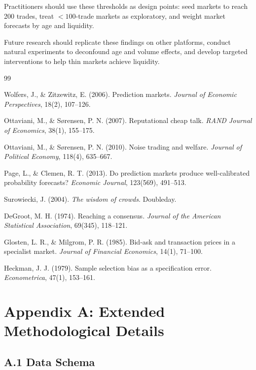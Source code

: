\documentclass[a4paper,11pt]{article}
\theoremstyle{plain}
\theoremstyle{definition}
\begin{document}
Practitioners should use these thresholds as design points: seed markets to reach 200 trades, treat $<100$-trade markets as exploratory, and weight market forecasts by age and liquidity.

Future research should replicate these findings on other platforms, conduct natural experiments to deconfound age and volume effects, and develop targeted interventions to help thin markets achieve liquidity.


\begin{thebibliography}{99}

 Wolfers, J., \& Zitzewitz, E. (2006). Prediction markets. \textit{Journal of Economic Perspectives}, 18(2), 107--126.

 Ottaviani, M., \& Sørensen, P. N. (2007). Reputational cheap talk. \textit{RAND Journal of Economics}, 38(1), 155--175.

 Ottaviani, M., \& Sørensen, P. N. (2010). Noise trading and welfare. \textit{Journal of Political Economy}, 118(4), 635--667.

 Page, L., \& Clemen, R. T. (2013). Do prediction markets produce well-calibrated probability forecasts? \textit{Economic Journal}, 123(569), 491--513.

 Surowiecki, J. (2004). \textit{The wisdom of crowds}. Doubleday.

 DeGroot, M. H. (1974). Reaching a consensus. \textit{Journal of the American Statistical Association}, 69(345), 118--121.

 Glosten, L. R., \& Milgrom, P. R. (1985). Bid-ask and transaction prices in a specialist market. \textit{Journal of Financial Economics}, 14(1), 71--100.

 Heckman, J. J. (1979). Sample selection bias as a specification error. \textit{Econometrica}, 47(1), 153--161.

\end{thebibliography}

\appendix

\section{Appendix A: Extended Methodological Details}
\label{app:methods}

\subsection{A.1 Data Schema}
\end{document}
